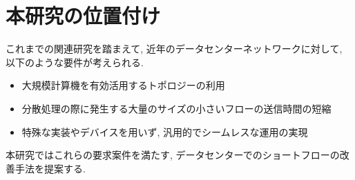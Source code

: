 % 
% 
% 





\section{本研究の位置付け}
これまでの関連研究を踏まえて, 近年のデータセンターネットワークに対して, 以下のような要件が考えられる.
\begin{itemize}
  \item 大規模計算機を有効活用するトポロジーの利用
  \item 分散処理の際に発生する大量のサイズの小さいフローの送信時間の短縮
  \item 特殊な実装やデバイスを用いず, 汎用的でシームレスな運用の実現
\end{itemize}
本研究ではこれらの要求案件を満たす, データセンターでのショートフローの改善手法を提案する. 
